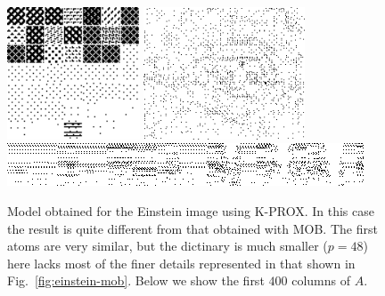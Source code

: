\documentclass[twocolumn]{IEEEtran}
\theoremstyle{definition}
\begin{document}
\begin{figure}[tp]
\includegraphics[height=1.55in]{fig/einstein_kprox_dict.png} %
\includegraphics[height=1.55in]{fig/einstein_kprox_err_zoom.png}\\[1ex]
\includegraphics[width=\columnwidth]{fig/einstein_kprox_coef_crop.png}
\caption{\label{fig:einstein-kprox} Model obtained for the Einstein image using K-PROX. In this case the result is quite different from that obtained with MOB. The first atoms are very similar, but the dictinary is much smaller ($p=48$) here lacks most of the finer details represented in that shown in Fig.~\ref{fig:einstein-mob}. Below we show the first $400$ columns of $A$. }
\end{figure}
%
\end{document}
